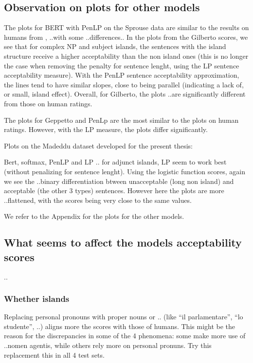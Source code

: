 \subsection{Observation on plots for other models}

The plots for BERT with PenLP on the Sprouse data are similar to the results on humans from \citet{sprouse2016experimental}, ..with some ..differences..
In the plots from the Gilberto scores, we see that for complex NP and subject islands, the sentences with the island structure receive a higher acceptability than the non island ones (this is no longer the case when removing the penalty for sentence lenght, using the LP sentence acceptability measure). With the PenLP sentence acceptability approximation, the lines tend to have similar slopes, close to being parallel (indicating a lack of, or small, island effect). Overall, for Gilberto, the plots ..are significantly different from those on human ratings.

The plots for Geppetto and PenLp are the most similar to the plots on human ratings. However, with the LP measure, the plots differ significantly.

Plots on the Madeddu dataset developed for the present thesis:

Bert, softmax, PenLP and LP
..
for adjunct islands, LP seem to work best (without penalizing for sentence lenght).
Using the logistic function scores, again we see the ..binary differentiation btween unacceptable (long non island) and acceptable (the other 3 types) sentences. However here the plots are more ..flattened, with the scores being very close to the same values.

We refer to the Appendix for the plots for the other models.

\subsection{What seems to affect the models acceptability scores}
..

\subsubsection{Whether islands}
Replacing personal pronouns with proper nouns or .. (like “il parlamentare”, “lo studente”, ..) aligns more the scores with those of humans.
This might be the reason for the discrepancies in some of the 4 phenomena: some make more use of ..nomen agentis, while others rely more on personal pronuns.
Try this replacement this in all 4 test sets.


